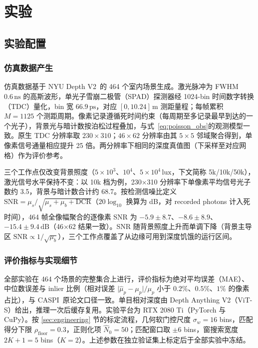
\section{实验}

\subsection{实验配置}
\label{sec:setup}

\subsubsection{仿真数据产生}
仿真数据基于 NYU Depth V2~\cite{nyudepth}的 464 个室内场景生成。激光脉冲为 FWHM $0.6\,\mathrm{ns}$ 的高斯波形，单光子雪崩二极管（SPAD）探测器经 1024-bin 时间数字转换（TDC）量化，bin 宽 $66.9\,\mathrm{ps}$，对应 $[0,10.24]\,\mathrm{m}$ 测距量程；每帧累积 $M=1125$ 个测距周期。像素记录遵循死时间约束（每周期至多记录最早到达的一个光子），背景光与暗计数按泊松过程叠加，与式~\eqref{eq:poisson_obs}的观测模型一致。原生 TDC 分辨率取 $230\times310$；$46\times62$ 分辨率由其 $5\times5$ 邻域聚合得到，单像素信号通量相应提升 25 倍。两分辨率下相同的深度真值图（下采样至对应网格）作为评价参考。

三个工作点仅改变背景照度（$5\times10^3$、$10^4$、$5\times10^4\,\mathrm{lux}$，下文简称 5k/10k/50k），激光信号水平保持不变：以 10k 档为例，230×310 分辨率下单像素平均信号光子数约 3.5，背景与暗计数合计约 68.7。按检测信噪比定义 $\mathrm{SNR}=\mu_s/\sqrt{\mu_s+\mu_b+\mathrm{DCR}}$（$20\log_{10}$ 换算为 dB，对 recorded photons 计入死时间），464 帧全像幅聚合的逐像素 SNR 为 $-5.9\pm8.7$、$-8.6\pm8.9$、$-15.4\pm9.4\,\mathrm{dB}$（46×62 结果一致）。SNR 随背景照度上升而单调下降（背景主导区 $\mathrm{SNR}\propto1/\sqrt{\mu_b}$），三个工作点覆盖了从边缘可用到深度饥饿的运行区间。

\subsubsection{评价指标与实现细节}
全部实验在 464 个场景的完整集合上进行，评价指标为绝对平均误差（MAE）、中位数误差与 inlier 比例（相对误差 $\lvert\hat\mu_p-\mu_p\rvert/\mu_p$ 小于 $0.2\%$、$0.5\%$、$1\%$ 的像素占比），与 CASPI~\cite{caspi}原论文口径一致。单目相对深度由 Depth Anything V2（ViT-S）给出，推理一次后缓存复用。实验平台为 RTX 2080 Ti（PyTorch 与 CuPy）。按 \ref{sec:engineering} 节的标定流程，几何软门控尺度 $\sigma_w=16$ bins，匹配得分下限 $\rho_{\mathrm{floor}}=0.3$，正则化项 $\hat N_0=50$；匹配窗口取 $\pm6$ bins，窗搜索宽度 $2K+1=5$ bins（$K=2$）。上述参数在独立验证集上标定后于全部实验中冻结。


